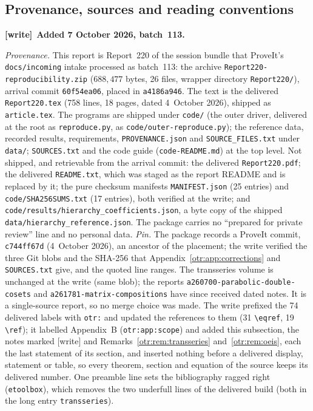 \documentclass[11pt,a4paper]{article}
\theoremstyle{definition}\newtheorem{definition}[theorem]{Definition}
\theoremstyle{remark}\newtheorem{remark}[theorem]{Remark}
\newcommand{\file}[1]{\nolinkurl{#1}}
\newenvironment{writenote}[1][]{\par\smallskip\begingroup\small
 \noindent\textbf{[write]}\if\relax\detokenize{#1}\relax\else~\textbf{#1.}\fi\ }%
 {\par\endgroup\smallskip}
\begin{document}
\subsection{Provenance, sources and reading conventions}\label{otr:sec:provenance}
\begin{writenote}[Added 7 October 2026, batch~113]\raggedright
\emph{Provenance.} This report is Report~220 of the session bundle that
ProveIt's \file{docs/incoming} intake processed as batch~113: the archive
\file{Report220-reproducibility.zip} ($688{,}477$ bytes, 26 files, wrapper
directory \file{Report220/}), arrival commit \file{60f54ea06}, placed in
\file{a4186a946}. The text is the delivered \file{Report220.tex} (758 lines,
18 pages, dated 4~October 2026), shipped as \file{article.tex}. The programs
are shipped under \file{code/} (the outer driver, delivered at the root as
\file{reproduce.py}, as \file{code/outer-reproduce.py}); the reference data,
recorded results, requirements, \file{PROVENANCE.json} and
\file{SOURCE_FILES.txt} under \file{data/}; \file{SOURCES.txt} and the code
guide (\file{code-README.md}) at the top level. Not shipped, and retrievable
from the arrival commit: the delivered \file{Report220.pdf}; the delivered
\file{README.txt}, which was staged as the report README and is replaced by
it; the pure checksum manifests \file{MANIFEST.json} (25 entries) and
\file{code/SHA256SUMS.txt} (17 entries), both verified at the write; and
\file{code/results/hierarchy_coefficients.json}, a byte copy of the shipped
\file{data/hierarchy_reference.json}. The package carries no ``prepared for
private review'' line and no personal data. \emph{Pin.} The package records a
ProveIt commit, \file{c744ff67d} (4~October 2026), an ancestor of the
placement; the write verified the three Git blobs and the SHA-256 that
Appendix~\ref{otr:app:corrections} and \file{SOURCES.txt} give, and the
quoted line ranges. The transseries volume is unchanged at the write (same
blob); the reports \file{a260700-parabolic-double-cosets} and
\file{a261781-matrix-compositions} have since received dated notes. It is a
single-source report, so no merge choice was made. The write prefixed the 74
delivered labels with \file{otr:} and updated the references to them
(31 \verb|\eqref|, 19 \verb|\ref|); it labelled Appendix~B (\file{otr:app:scope}) and added this
subsection, the notes marked [write] and
Remarks~\ref{otr:rem:transseries} and~\ref{otr:rem:oeis}, each the last
statement of its section, and inserted nothing before a delivered display,
statement or table, so every theorem, section and equation of the source
keeps its delivered number. One preamble line sets the bibliography ragged
right (\texttt{etoolbox}), which removes the two underfull lines of the
delivered build (both in the long entry \texttt{transseries}).


\end{writenote}
\end{document}
